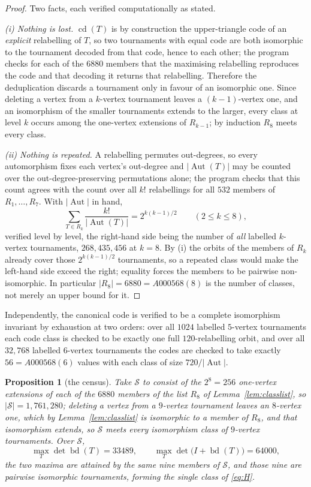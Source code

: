 \documentclass[11pt]{amsart}
\newtheorem{proposition}[theorem]{Proposition}
\theoremstyle{remark}
\begin{document}
\begin{proof}
Two facts, each verified computationally as stated.

\emph{(i) Nothing is lost.} $\operatorname{cd}(T)$ is by construction the upper-triangle code of
an \emph{explicit} relabelling of $T$, so two tournaments with equal code are both isomorphic to
the tournament decoded from that code, hence to each other; the program checks for each of the
$6880$ members that the maximising relabelling reproduces the code and that decoding it returns
that relabelling. Therefore the deduplication discards a tournament only in favour of an
isomorphic one. Since deleting a vertex from a $k$-vertex tournament leaves a $(k-1)$-vertex one,
and an isomorphism of the smaller tournaments extends to the larger, every class at level $k$
occurs among the one-vertex extensions of $R_{k-1}$; by induction $R_8$ meets every class.

\emph{(ii) Nothing is repeated.} A relabelling permutes out-degrees, so every automorphism fixes
each vertex's out-degree and $|\!\operatorname{Aut}(T)|$ may be counted over the out-degree-preserving
permutations alone; the program checks that this count agrees with the count over all $k!$
relabellings for all $532$ members of $R_1,\dots,R_7$. With $|\!\operatorname{Aut}|$ in hand,
\[
  \sum_{T\in R_k}\frac{k!}{|\!\operatorname{Aut}(T)|}=2^{k(k-1)/2}
  \qquad (2\le k\le 8),
\]
verified level by level, the right-hand side being the number of \emph{all} labelled $k$-vertex
tournaments, $268{,}435{,}456$ at $k=8$. By (i) the orbits of the members of $R_k$ already cover
those $2^{k(k-1)/2}$ tournaments, so a repeated class would make the left-hand side exceed the
right; equality forces the members to be pairwise non-isomorphic. In particular
$|R_8|=6880=A000568(8)$ is the number of classes, not merely an upper bound for it.
\end{proof}

\noindent Independently, the canonical code is verified to be a complete isomorphism invariant
by exhaustion at two orders: over all $1024$ labelled $5$-vertex tournaments each code class is
checked to be exactly one full $120$-relabelling orbit, and over all $32{,}768$ labelled
$6$-vertex tournaments the codes are checked to take exactly $56=A000568(6)$ values with each
class of size $720/|\!\operatorname{Aut}|$.

\begin{proposition}[the census]\label{prop:census}
Take $\mathcal S$ to consist of the $2^{8}=256$ one-vertex extensions of each of the
$6880$ members of the list $R_8$ of Lemma~\ref{lem:classlist}, so
$|\mathcal S|=1{,}761{,}280$; deleting a vertex from a $9$-vertex tournament leaves an
$8$-vertex one, which by Lemma~\ref{lem:classlist} is isomorphic to a member of $R_8$, and
that isomorphism extends, so $\mathcal S$ meets every isomorphism class of $9$-vertex
tournaments.
Over $\mathcal S$,
\[
  \max_T\det\operatorname{bd}(T)=33489,
  \qquad
  \max_T\det\bigl(I+\operatorname{bd}(T)\bigr)=64000,
\]
the two maxima are attained by the same nine members of $\mathcal S$, and those nine are
pairwise isomorphic tournaments, forming the single class of \eqref{eq:H}.
\end{proposition}
\end{document}
